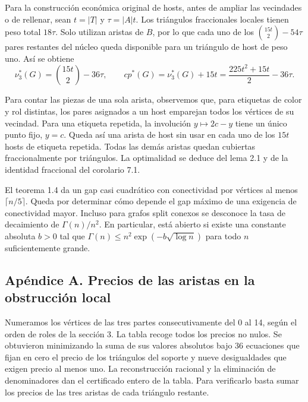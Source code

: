 \documentclass[spanish,11pt,a4paper]{article}
\begin{document}
Para la construcción económica original de hosts, antes de ampliar las vecindades o de rellenar, sean \(t=|T|\) y \(\tau=|A|t\). Los triángulos fraccionales locales tienen peso total \(18\tau\). Solo utilizan aristas de \(B\), por lo que cada uno de los \(\binom{15t}{2}-54\tau\) pares restantes del núcleo queda disponible para un triángulo de host de peso uno. Así se obtiene
\[\nu_3^*(G)=\binom{15t}{2}-36\tau,\qquad
cp^*(G)=\nu_3^*(G)+15t=\frac{225t^2+15t}{2}-36\tau.\]

Para contar las piezas de una sola arista, observemos que, para etiquetas de color y rol distintas, los pares asignados a un host emparejan todos los vértices de su vecindad. Para una etiqueta repetida, la involución \(y\mapsto2c-y\) tiene un único punto fijo, \(y=c\). Queda así una arista de host sin usar en cada uno de los \(15t\) hosts de etiqueta repetida. Todas las demás aristas quedan cubiertas fraccionalmente por triángulos. La optimalidad se deduce del lema 2.1 y de la identidad fraccional del corolario 7.1.

El teorema 1.4 da un gap casi cuadrático con conectividad por vértices al menos \(\lceil n/5\rceil\). Queda por determinar cómo depende el gap máximo de una exigencia de conectividad mayor. Incluso para grafos split conexos se desconoce la tasa de decaimiento de \(\Gamma(n)/n^2\). En particular, está abierto si existe una constante absoluta \(b>0\) tal que \(\Gamma(n)\le n^2\exp(-b\sqrt{\log n})\) para todo \(n\) suficientemente grande.

\subsection{Apéndice A. Precios de las aristas en la obstrucción local}\label{apuxe9ndice-a.-precios-de-las-aristas-en-la-obstrucciuxf3n-local}

Numeramos los vértices de las tres partes consecutivamente del 0 al 14, según el orden de roles de la sección 3. La tabla recoge todos los precios no nulos. Se obtuvieron minimizando la suma de sus valores absolutos bajo 36 ecuaciones que fijan en cero el precio de los triángulos del soporte y nueve desigualdades que exigen precio al menos uno. La reconstrucción racional y la eliminación de denominadores dan el certificado entero de la tabla. Para verificarlo basta sumar los precios de las tres aristas de cada triángulo restante.
\end{document}
